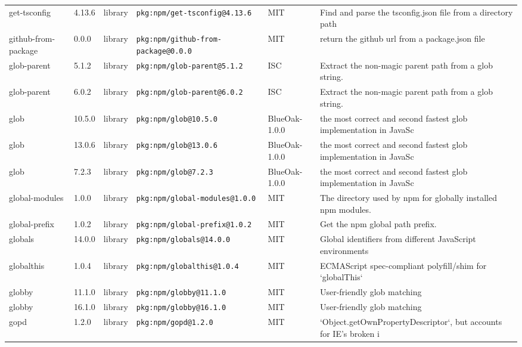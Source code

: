 \documentclass[11pt,a4paper]{article}
\begin{document}
\begin{longtable}{|p{4cm}|p{2cm}|p{1.6cm}|p{5cm}|p{1.5cm}|p{3.5cm}|}
\raggedright get-tsconfig & 4.13.6 & library & \small\texttt{pkg:npm/get-tsconfig@4.13.6} & MIT & \small Find and parse the tsconfig.json file from a directory path \\
\raggedright github-from-package & 0.0.0 & library & \small\texttt{pkg:npm/github-from-package@0.0.0} & MIT & \small return the github url from a package.json file \\
\raggedright glob-parent & 5.1.2 & library & \small\texttt{pkg:npm/glob-parent@5.1.2} & ISC & \small Extract the non-magic parent path from a glob string. \\
\raggedright glob-parent & 6.0.2 & library & \small\texttt{pkg:npm/glob-parent@6.0.2} & ISC & \small Extract the non-magic parent path from a glob string. \\
\raggedright glob & 10.5.0 & library & \small\texttt{pkg:npm/glob@10.5.0} & BlueOak-1.0.0 & \small the most correct and second fastest glob implementation in JavaSc \\
\raggedright glob & 13.0.6 & library & \small\texttt{pkg:npm/glob@13.0.6} & BlueOak-1.0.0 & \small the most correct and second fastest glob implementation in JavaSc \\
\raggedright glob & 7.2.3 & library & \small\texttt{pkg:npm/glob@7.2.3} & BlueOak-1.0.0 & \small the most correct and second fastest glob implementation in JavaSc \\
\raggedright global-modules & 1.0.0 & library & \small\texttt{pkg:npm/global-modules@1.0.0} & MIT & \small The directory used by npm for globally installed npm modules. \\
\raggedright global-prefix & 1.0.2 & library & \small\texttt{pkg:npm/global-prefix@1.0.2} & MIT & \small Get the npm global path prefix. \\
\raggedright globals & 14.0.0 & library & \small\texttt{pkg:npm/globals@14.0.0} & MIT & \small Global identifiers from different JavaScript environments \\
\raggedright globalthis & 1.0.4 & library & \small\texttt{pkg:npm/globalthis@1.0.4} & MIT & \small ECMAScript spec-compliant polyfill/shim for `globalThis` \\
\raggedright globby & 11.1.0 & library & \small\texttt{pkg:npm/globby@11.1.0} & MIT & \small User-friendly glob matching \\
\raggedright globby & 16.1.0 & library & \small\texttt{pkg:npm/globby@16.1.0} & MIT & \small User-friendly glob matching \\
\raggedright gopd & 1.2.0 & library & \small\texttt{pkg:npm/gopd@1.2.0} & MIT & \small `Object.getOwnPropertyDescriptor`, but accounts for IE's broken i \\

\end{longtable}
\end{document}
